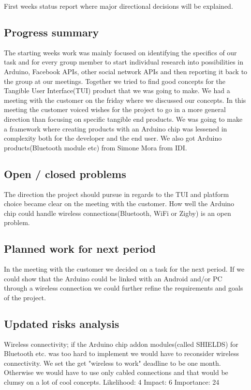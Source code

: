 First weeks status report where major directional decisions will be explained.

\subsection{Progress summary}
The starting weeks work was mainly focused on identifying the specifics of our task and for every group member to start individual research into possibilities in Arduino, Facebook APIs, other social network APIs and then reporting it back to the group at our meetings. Together we tried to find good concepts for the Tangible User Interface(TUI) product that we was going to make. We had a meeting with the customer on the friday where we discussed our concepts. In this meeting the customer voiced wishes for the project to go in a more general direction than focusing on specific tangible end products. We was going to make a framework where creating products with an Arduino chip was lessened in complexity both for the developer and the end user.
We also got Arduino products(Bluetooth module etc) from Simone Mora from IDI.

\subsection{Open / closed problems}
The direction the project should pursue in regards to the TUI and platform choice became clear on  the meeting with the customer.
How well the Arduino chip could handle wireless connections(Bluetooth, WiFi or Zigby) is an open problem.

\subsection{Planned work for next period}
In the meeting with the customer we decided on a task for the next period. If we could show that the Arduino could be linked with an Android and/or PC through a wireless connection we could further refine the requirements and goals of the project. 

\subsection{Updated risks analysis}
Wireless connectivity; if the Arduino chip addon modules(called SHIELDS) for Bluetooth etc. was too hard to implement we would have to reconsider wireless connectivity. We set the get "wireless to work" deadline to be one month. Otherwise we would have to use only cabled connections and that would be clumsy on a lot of cool concepts.
 Likelihood: 4 Impact: 6 Importance: 24
